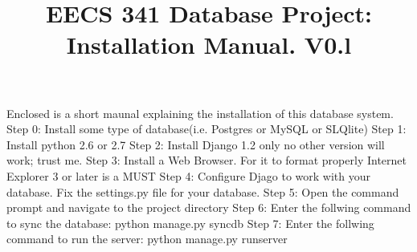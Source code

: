 \documentclass[11pt,oneside,a4paper]{article}
\title{EECS 341 Database Project: Installation Manual. V0.l}
\begin{document}
\maketitle
Enclosed is a short maunal explaining the installation of this database system.
Step 0: Install some type of database(i.e. Postgres or MySQL or SLQlite)
Step 1: Install python 2.6 or 2.7 
Step 2: Install Django 1.2 only no other version will work; trust me.  
Step 3: Install a Web Browser. For it to format properly Internet Explorer 3 or later is a MUST
Step 4: Configure Djago to work with your database. Fix the settings.py file for your database.
Step 5: Open the command prompt and navigate to the project directory
Step 6: Enter the follwing command to sync the database:
python manage.py syncdb
Step 7: Enter the follwing command to run the server:
python manage.py runserver
\end{document}
